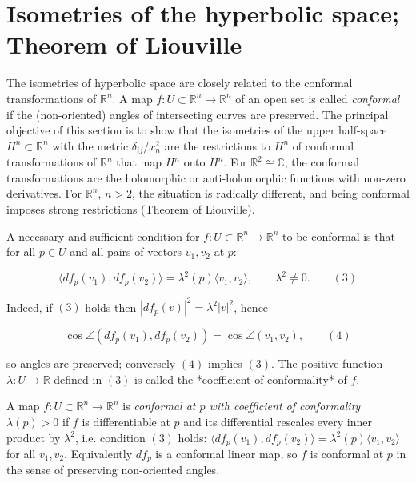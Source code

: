 \section{Isometries of the hyperbolic space; Theorem of Liouville}

The isometries of hyperbolic space are closely related to the conformal
transformations of $\mathbb{R}^n$. A map $f:U\subset\mathbb{R}^n\to\mathbb{R}^n$ of
an open set is called \emph{conformal} if the (non-oriented) angles of intersecting
curves are preserved. The principal objective of this section is to show that the
isometries of the upper half-space $H^n\subset\mathbb{R}^n$ with the metric
$\delta_{ij}/x_n^2$ are the restrictions to $H^n$ of conformal transformations of
$\mathbb{R}^n$ that map $H^n$ onto $H^n$. For $\mathbb{R}^2\cong\mathbb{C}$, the
conformal transformations are the holomorphic or anti-holomorphic functions with
non-zero derivatives. For $\mathbb{R}^n$, $n>2$, the situation is radically
different, and being conformal imposes strong restrictions (Theorem of Liouville).

A necessary and sufficient condition for $f:U\subset\mathbb{R}^n\to\mathbb{R}^n$ to
be conformal is that for all $p\in U$ and all pairs of vectors $v_1,v_2$ at $p$:

$$
\langle df_p(v_1),df_p(v_2)\rangle=\lambda^2(p)\langle v_1,v_2\rangle,\qquad\lambda^2\neq 0.\qquad(3)
$$

Indeed, if $(3)$ holds then $|df_p(v)|^2=\lambda^2|v|^2$, hence

$$
\cos\angle(df_p(v_1),df_p(v_2))=\cos\angle(v_1,v_2),\qquad(4)
$$

so angles are preserved; conversely $(4)$ implies $(3)$. The positive function
$\lambda:U\to\mathbb{R}$ defined in $(3)$ is called the *coefficient of
conformality* of $f$.

\begin{definition}
  \label{def:dc-ch8-5-conformal}
  \leanok
  A map $f:U\subset\mathbb{R}^n\to\mathbb{R}^n$ is \emph{conformal at $p$ with
  coefficient of conformality $\lambda(p)>0$} if $f$ is differentiable at $p$ and
  its differential rescales every inner product by $\lambda^2$, i.e. condition
  $(3)$ holds:
  $\langle df_p(v_1),df_p(v_2)\rangle=\lambda^2(p)\langle v_1,v_2\rangle$ for all
  $v_1,v_2$. Equivalently $df_p$ is a conformal linear map, so $f$ is conformal at
  $p$ in the sense of preserving non-oriented angles.
\end{definition}

